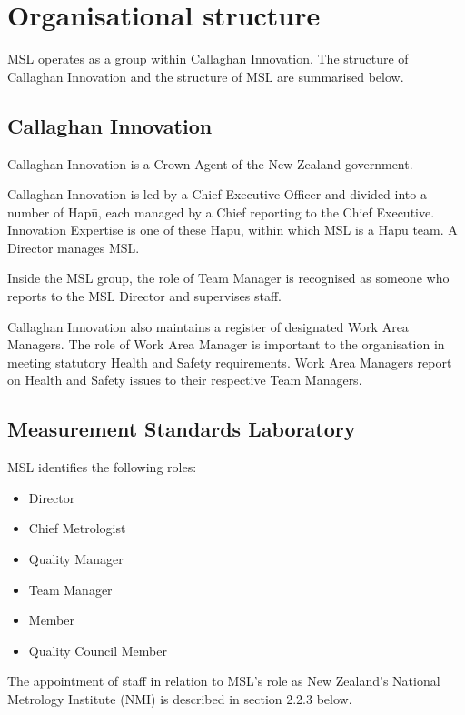 \section{Organisational structure}
\label{s:organisation}
MSL operates as a group within Callaghan Innovation. The structure of Callaghan Innovation and the structure of MSL are summarised below.

\subsection{Callaghan Innovation}
Callaghan Innovation is a Crown Agent of the New Zealand government. 

Callaghan Innovation is led by a Chief Executive Officer and divided into a number of Hap\=u, each managed by a Chief reporting to the Chief Executive. Innovation Expertise is one of these Hap\=u, within which MSL is a Hap\=u team. A Director manages MSL.

Inside the MSL group, the role of Team Manager is recognised as someone who reports to the MSL Director and supervises staff.

Callaghan Innovation also maintains a register of designated Work Area Managers. The role of Work Area Manager is important to the organisation in meeting statutory Health and Safety requirements. 
Work Area Managers report on Health and Safety issues to their respective Team Managers.

\subsection{Measurement Standards Laboratory}
MSL identifies the following roles:
\begin{itemize}
\item	Director
\item	Chief Metrologist
\item	Quality Manager
\item	Team Manager
\item	Member
\item	Quality Council Member
\end{itemize}
The appointment of staff in relation to MSL's role as New Zealand's National Metrology Institute (NMI) is described in section 2.2.3 below.
